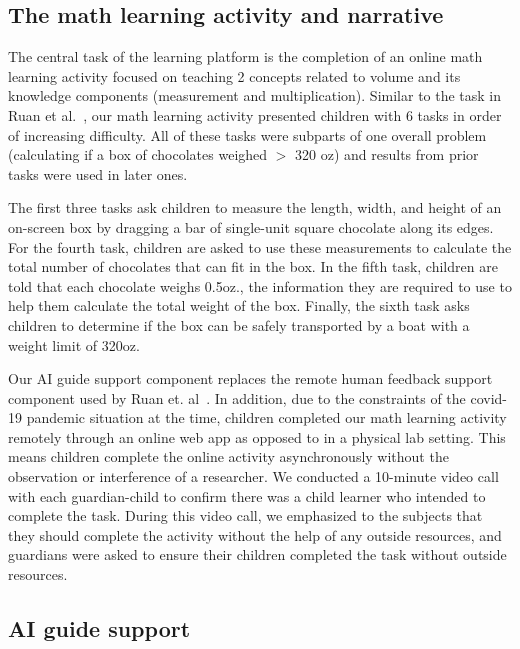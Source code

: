 \documentclass[sn-mathphys,Numbered]{sn-jnl}%
\theoremstyle{thmstyleone}%
\theoremstyle{thmstyletwo}%
\theoremstyle{thmstylethree}%
\begin{document}
\begin{appendices}
\subsection*{The math learning activity and narrative}

The central task of the learning platform is the completion of an online math learning activity focused on teaching 2 concepts related to volume and its knowledge components (measurement and multiplication). Similar to the task in Ruan et al.~\cite{woz}, our math learning activity presented children with 6 tasks in order of increasing difficulty. All of these tasks were subparts of one overall problem (calculating if a box of chocolates weighed $>$ 320 oz) and results from prior tasks were used in later ones.

The first three tasks ask children to measure the length, width, and height of an on-screen box by dragging a bar of single-unit square chocolate along its edges. For the fourth task, children are asked to use these measurements to calculate the total number of chocolates that can fit in the box. In the fifth task, children are told that each chocolate weighs 0.5oz., the information they are required to use to help them calculate the total weight of the box. Finally, the sixth task asks children to determine if the box can be safely transported by a boat with a weight limit of 320oz.

Our AI guide support component replaces the remote human feedback support component used by Ruan et. al~\cite{woz}. In addition, due to the constraints of the covid-19 pandemic situation at the time, children completed our math learning activity remotely through an online web app as opposed to in a physical lab setting. This means children complete the online activity asynchronously without the observation or interference of a researcher. We conducted a 10-minute video call with each guardian-child to confirm there was a child learner who intended to complete the task. During this video call, we emphasized to the subjects that they should complete the activity without the help of any outside resources, and guardians were asked to ensure their children completed the task without outside resources. 


\subsection*{AI guide support}


\end{appendices}
\end{document}
